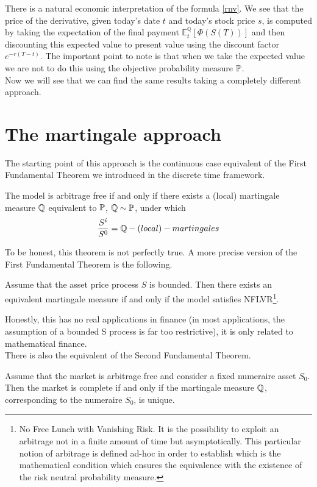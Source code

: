 There is a natural economic interpretation of the formula \eqref{rnv}. We see that the price of the derivative, given today’s date $t$ and today’s stock price $s$, is computed by taking the expectation of the final payment $\mathbb{E}^{\mathbb{Q}}_t [\Phi(S(T))]$ and then discounting this expected value to present value using the discount factor $e^{-r(T-t)}$. The important point to note is that when we take the expected value we are not to do this using the objective probability measure $\mathbb{P}$.\\
Now we will see that we can find the same results taking a completely different approach.

\section{The martingale approach} %
The starting point of this approach is the continuous case equivalent of the First Fundamental Theorem we introduced in the discrete time framework.
\begin{theorem}
    The model is arbitrage free if and only if there exists a (local) martingale measure $\mathbb{Q}$ equivalent to $\mathbb{P}$, $\mathbb{Q}\sim\mathbb{P}$, under which 
    \begin{equation}
        \dfrac{S^i}{S^0} = \mathbb{Q}-(local)-martingales
    \end{equation}
\end{theorem}
To be honest, this theorem is not perfectly true. A more precise version of the First Fundamental Theorem is the following.
\begin{theorem}\label{firstfundth}
    Assume that the asset price process $S$ is bounded. Then there exists an equivalent martingale measure if and only if the model satisfies NFLVR\footnote{No Free Lunch with Vanishing Risk. It is the possibility to exploit an arbitrage not in a finite amount of time but asymptotically. This particular notion of arbitrage is defined ad-hoc in order to establish which is the mathematical condition which ensures the equivalence with the existence of the risk neutral probability measure.}.
\end{theorem}
Honestly, this has no real applications in finance (in most applications, the assumption of a bounded S process is far too restrictive), it is only related to mathematical finance.\\
There is also the equivalent of the Second Fundamental Theorem.
\begin{theorem}\label{secondfundth}
    Assume that the market is arbitrage free and consider a fixed numeraire asset $S_0$. Then the market is complete if and only if the martingale measure $\mathbb{Q}$, corresponding to the numeraire $S_0$, is unique.
\end{theorem}

